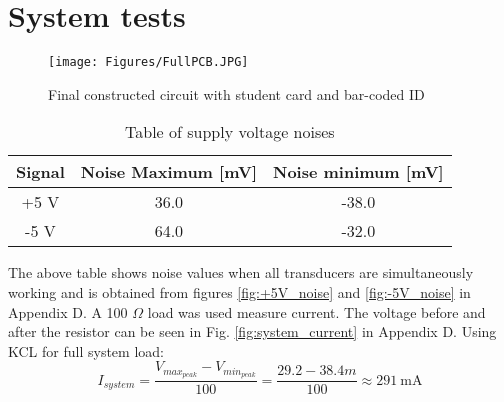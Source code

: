 \chapter{System tests}

\begin{figure}[H]
    \centering
    \texttt{[image: Figures/FullPCB.JPG]}
    \caption{Final constructed circuit with student card and bar-coded ID}
\end{figure}


\begin{table}[H]
\centering
\begin{tabular}{|c|c|c|}
\hline
Signal & Noise Maximum {[}mV{]} & Noise minimum {[}mV{]} \\ \hline
+5 V   & 36.0            &-38.0         \\ \hline
-5 V   & 64.0                       & -32.0                       \\ \hline
\end{tabular}
\caption{Table of supply voltage noises}
\label{supply_noise_table}
\end{table}
 The above table shows noise values when all transducers are simultaneously working and is obtained from figures \ref{fig:+5V_noise} and  \ref{fig:-5V_noise} in Appendix D.
A 100 $\Omega$ load was used measure current. The voltage before and after the resistor can be seen in Fig. \ref{fig:system_current} in Appendix D. Using KCL for full system load: $$I_{system}=\frac{V_{max_{peak}}-V_{min_{peak}}}{100}=\frac{29.2-38.4m}{100}\approx\SI{291}{\milli\ampere}$$ 










